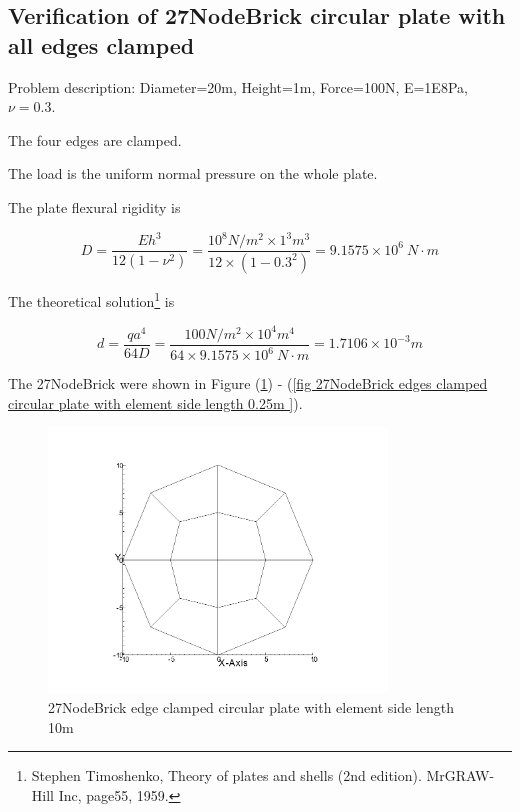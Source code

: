 \documentclass[fleqn,11pt,letter]{article}
\begin{document}
\newpage
\subsection{Verification of 27NodeBrick circular plate with all edges clamped}

Problem description: Diameter=20m, Height=1m, Force=100N, E=1E8Pa, $\nu=0.3$. 

The four edges are clamped. 

The load is the uniform normal pressure on the whole plate. 


The plate flexural rigidity is 

\begin{equation}
  D=\frac{Eh^3}{12(1-\nu^2)}=\frac{10^8 N/m^2 \times 1^3 m^3 }{12 \times (1-0.3^2) }= 9.1575 \times 10^6 \ N\cdot m
\end{equation}

The theoretical solution\footnote{Stephen Timoshenko, Theory of plates and shells (2nd edition). MrGRAW-Hill Inc, page55, 1959.} is 

\begin{equation}
  d= \frac{q a^4}{64D}=\frac{100 N/m^2 \times 10^4 m^4}{64 \times 9.1575 \times 10^6 \ N\cdot m}=1.7106\times 10^{-3} m
\end{equation}

The 27NodeBrick were shown in Figure (\ref{fig 27NodeBrick edges clamped circular plate with element side length 10m }) - (\ref{fig 27NodeBrick edges clamped circular plate with element side length 0.25m }). 




\begin{figure}[H]
  \centering
  \includegraphics[width=9cm]{../Figure_files/27NodeBrick/circular_plate1.png}
  \caption{27NodeBrick edge clamped circular plate with element side length 10m }
  \label{fig 27NodeBrick edges clamped circular plate with element side length 10m }
\end{figure}
\end{document}

